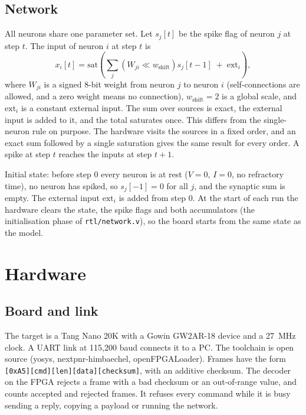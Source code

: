 \documentclass[11pt]{article}
\begin{document}
\subsection{Network}
\label{sec:netinput}
All neurons share one parameter set. Let $s_j[t]$ be the spike flag of neuron $j$ at step $t$. The input of neuron $i$ at step $t$ is
\begin{equation}
x_i[t] = \mathrm{sat}\!\left(\sum_j \left(W_{ji} \ll w_{\mathrm{shift}}\right) s_j[t-1] \;+\; \mathrm{ext}_i\right),
\end{equation}
where $W_{ji}$ is a signed 8-bit weight from neuron $j$ to neuron $i$ (self-connections are allowed, and a zero weight means no connection), $w_{\mathrm{shift}}=2$ is a global scale, and $\mathrm{ext}_i$ is a constant external input.
The sum over sources is exact, the external input is added to it, and the total saturates once.
This differs from the single-neuron rule on purpose. The hardware visits the sources in a fixed order, and an exact sum followed by a single saturation gives the same result for every order.
A spike at step $t$ reaches the inputs at step $t+1$.

Initial state: before step 0 every neuron is at rest ($V=0$, $I=0$, no refractory time), no neuron has spiked, so $s_j[-1]=0$ for all $j$, and the synaptic sum is empty. The external input $\mathrm{ext}_i$ is added from step 0. At the start of each run the hardware clears the state, the spike flags and both accumulators (the initialisation phase of \texttt{rtl/network.v}), so the board starts from the same state as the model.

\section{Hardware}
\label{sec:hardware}
\subsection{Board and link}
The target is a Tang Nano 20K with a Gowin GW2AR-18 device and a 27~MHz clock. A UART link at 115,200 baud connects it to a PC. The toolchain is open source (yosys, nextpnr-himbaechel, openFPGALoader).
Frames have the form \texttt{[0xA5][cmd][len][data][checksum]}, with an additive checksum.
The decoder on the FPGA rejects a frame with a bad checksum or an out-of-range value, and counts accepted and rejected frames. It refuses every command while it is busy sending a reply, copying a payload or running the network.
\end{document}
